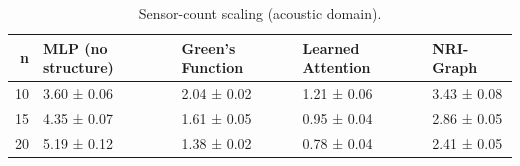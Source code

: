 \begin{table}
\caption{Sensor-count scaling (acoustic domain).}
\label{tab:sensor-scaling-acoustic}
\begin{tabular}{rllll}
\toprule
n & MLP (no structure) & Green's Function & Learned Attention & NRI-Graph \\
\midrule
10 & 3.60 ± 0.06 & 2.04 ± 0.02 & 1.21 ± 0.06 & 3.43 ± 0.08 \\
15 & 4.35 ± 0.07 & 1.61 ± 0.05 & 0.95 ± 0.04 & 2.86 ± 0.05 \\
20 & 5.19 ± 0.12 & 1.38 ± 0.02 & 0.78 ± 0.04 & 2.41 ± 0.05 \\
\bottomrule
\end{tabular}
\end{table}
